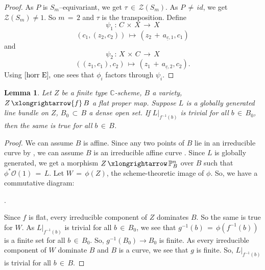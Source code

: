 \documentclass[12pt,reqno]{amsart}
\newtheorem{lemma}{Lemma}[section]
\theoremstyle{definition}
\numberwithin{equation}{section}
\begin{document}
\begin{proof}
As $P$ is $S_{m}$--equivariant, we get $\tau\,\in\, \mathcal{Z}(S_{m})$. As $P\,\neq\, {id}$, we get $\mathcal{Z}(S_{m})\neq 1$. So $m\,=\,2$ and $\tau$ is the transposition. Define
\begin{equation*}
\psi_{1}\,:\, C\,\times\, X\,\longrightarrow\, X    
\end{equation*}
\begin{equation*}
(c_{1}, (z_{2}, c_{2}))\,\mapsto \, (z_{2}\,+\, a_{\underline{c},1},c_{1})    
\end{equation*}
and 
\begin{equation*}
\psi_{2}\,:\, X\,\times\, C\,\longrightarrow\, X    
\end{equation*}
\begin{equation*}
((z_{1}, c_{1}), c_{2})\,\mapsto\,(z_{1}\,+\, a_{\underline{c},2}, c_{2}).    
\end{equation*}
Using $\eqref{horr E},$ one sees that $\phi_{i}$ factors through $\psi_{i}$.
\end{proof}
\begin{lemma}\label{family}
Let $Z$ be a finite type $\mathbb{C}$-scheme, $B$ a variety, $Z\,\xlongrightarrow{f}\,B$ a flat proper map. Suppose $L$ is a globally generated line bundle on $Z$, $B_{0}\,\subset\, B$ a dense open set. If $\left. L \right|_{f^{-1}(b)}$ is trivial for all $b\,\in\, B_{0}$, then the same is true for all $b\,\in\,B$.
\end{lemma}

\begin{proof}
We can assume $B$ is affine. Since any two points of $B$ lie in an irreducible curve by {\cite[Lemma, Page 53]{mumford1974abelian}}, we can assume $B$ is an irreducible affine curve . Since $L$ is globally generated, we get a morphism $Z\,\xlongrightarrow\,\mathbb{P}^{n}_{B}$ over $B$ such that $\phi^{\ast}\mathcal{O}(1)\,=\, L$. Let $W\,=\, \phi(Z)$, the scheme-theoretic image of $\phi$. So, we have a commutative diagram:

\begin{center}
.
\end{center}
Since $f$ is flat, every irreducible component of $Z$ dominates $B$. So the same is true for $W$. As $\left. L \right|_{f^{-1}(b)}$ is trivial for all $b\,\in\,B_{0}$, we see that $g^{-1}(b)\,=\,\phi(f^{-1}(b))$ is a finite set for all $b\,\in\, B_{0}$. So, $g^{-1}(B_{0})\to  B_{0}$ is finite. As every irreducible component of $W$ dominate $B$ and $B$ is a curve, we see that $g$ is finite. So, $\left. L \right|_{f^{-1}(b)}$ is trivial for all $b\,\in \, B$.
\end{proof}
\end{document}
